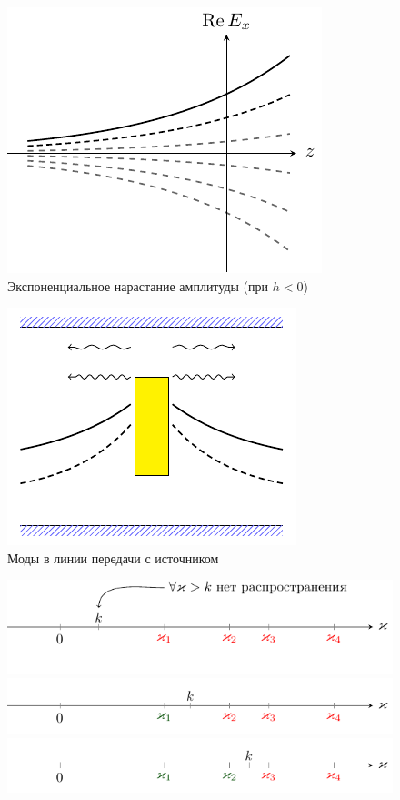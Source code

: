 \begin{figure}[H]
	\centering
	\includegraphics[scale=1.5]{img/lect3_ris3}
	\caption{Экспоненциальное нарастание амплитуды (при $h<0$)}
	\label{fig:lect3:3}
\end{figure}

\begin{figure}[H]
	\centering
	\includegraphics[scale=1.5]{img/lect3_ris4}
	\caption{Моды в линии передачи с источником}
	\label{fig:lect3:4}
\end{figure}

\begin{figure}[H]
	\centering
	\includegraphics[scale=1.5]{img/lect3_ris5}
	\includegraphics[scale=1.5]{img/lect3_ris6}
	\includegraphics[scale=1.5]{img/lect3_ris7}
\end{figure}

